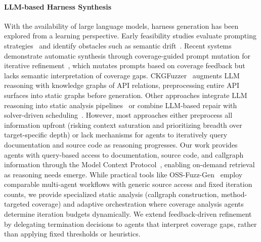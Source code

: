 \paragraph{LLM-based Harness Synthesis}
With the availability of large language models, harness generation has been explored from a learning perspective. Early feasibility studies evaluate prompting strategies~\cite{DBLP:conf/issta/ZhangZBLMXLSL24:HowEffectiveAreThey} and identify obstacles such as semantic drift~\cite{DBLP:conf/sigsoft/Jiang0MCZSWFWLZ24:WhenFuzzingMeetsLLMs}. Recent systems demonstrate automatic synthesis through coverage-guided prompt mutation for iterative refinement~\cite{DBLP:conf/ccs/LyuXCC24:PromptFuzz}, which mutates prompts based on coverage feedback but lacks semantic interpretation of coverage gaps. CKGFuzzer~\cite{DBLP:conf/icse/XuMZZCHLW25:CKGFuzzer} augments LLM reasoning with knowledge graphs of API relations, preprocessing entire API surfaces into static graphs before generation. Other approaches integrate LLM reasoning into static analysis pipelines~\cite{DBLP:journals/corr/abs-2505-03425:HGFuzzer} or combine LLM-based repair with solver-driven scheduling~\cite{DBLP:journals/corr/abs-2507-18289:Scheduzz}. However, most approaches either preprocess all information upfront (risking context saturation and prioritizing breadth over target-specific depth) or lack mechanisms for agents to iteratively query documentation and source code as reasoning progresses. Our work provides agents with query-based access to documentation, source code, and callgraph information through the Model Context Protocol~\cite{mcp}, enabling on-demand retrieval as reasoning needs emerge. While practical tools like OSS-Fuzz-Gen~\cite{oss-fuzz-gen} employ comparable multi-agent workflows with generic source access and fixed iteration counts, we provide specialized static analysis (callgraph construction, method-targeted coverage) and adaptive orchestration where coverage analysis agents determine iteration budgets dynamically. We extend feedback-driven refinement~\cite{DBLP:conf/ccs/LyuXCC24:PromptFuzz, DBLP:conf/uss/ZhangLZZZZXLL0H23:Rubick} by delegating termination decisions to agents that interpret coverage gaps, rather than applying fixed thresholds or heuristics.
